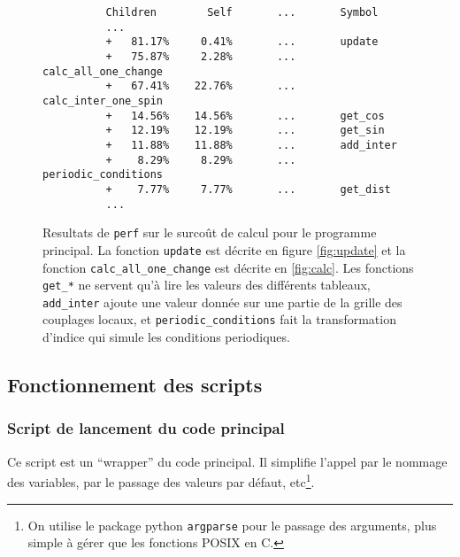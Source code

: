 \documentclass[a4paper, 11pt]{article}
\begin{document}
\begin{figure}
    \begin{center}
        \begin{verbatim}
          Children        Self       ...       Symbol
          ...
          +   81.17%     0.41%       ...       update    
          +   75.87%     2.28%       ...       calc_all_one_change
          +   67.41%    22.76%       ...       calc_inter_one_spin
          +   14.56%    14.56%       ...       get_cos
          +   12.19%    12.19%       ...       get_sin
          +   11.88%    11.88%       ...       add_inter
          +    8.29%     8.29%       ...       periodic_conditions
          +    7.77%     7.77%       ...       get_dist                 
          ...
        \end{verbatim}
    \end{center}
    \caption{Resultats de \texttt{perf} sur le surcoût de calcul pour le programme principal. La
    fonction \texttt{update} est décrite en figure \ref{fig:update} et la fonction
    \texttt{calc\_all\_one\_change} est décrite en \ref{fig:calc}. Les fonctions \texttt{get\_*} ne
    servent qu'à lire les valeurs des différents tableaux, \texttt{add\_inter} ajoute une valeur
    donnée sur une partie de la grille des couplages locaux, et \texttt{periodic\_conditions} fait
    la transformation d'indice qui simule les conditions periodiques. }
    \label{fig:perfdata}
\end{figure}

\subsection{Fonctionnement des scripts} 

\subsubsection{Script de lancement du code principal}

Ce script est un ``wrapper'' du code principal. Il simplifie l'appel par le nommage des variables, 
par le passage des valeurs par défaut, etc\footnote{On utilise le package python \texttt{argparse}
pour le passage des arguments, plus simple à gérer que les fonctions POSIX en C.}.
\end{document}
